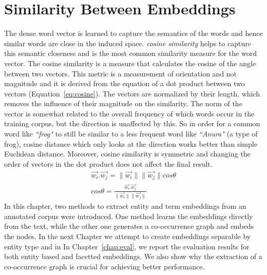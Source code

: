 \section{Similarity Between Embeddings }\label{sec:similarity}
The dense word vector is learned to capture the semantics of the words and hence similar words are close in the induced space. \emph{cosine similarity} helps to capture this semantic closeness and is the most common similarity measure for the word vector. The cosine similarity is a measure that calculates the cosine of the angle between two vectors. This metric is a measurement of orientation and not magnitude and it is derived from the equation of a dot product between two vectors (Equation~\ref{eq:cosine}). The vectors are normalized by their length, which removes the influence of their magnitude on the similarity. The norm of the vector is somewhat related to the overall frequency of which words occur in the training corpus, but the direction is unaffected by this. So in order for a common word like \emph{``frog"} to still be similar to a less frequent word like \emph{``Anura"} (a type of frog), cosine distance which only looks at the direction works better than simple Euclidean distance. Moreover, cosine similarity is symmetric and changing the order of vectors in the dot product does not affect the final result.
\begin{equation}
\begin{split}
\overrightarrow { w_i } .\overrightarrow { w_j } =\parallel \overrightarrow { w_i } \parallel \parallel \overrightarrow { w_j } \parallel cos\theta 
\\
cos\theta =\frac { \overrightarrow { w_i } .\overrightarrow { w_j }  }{ \parallel \overrightarrow { w_i } \parallel \parallel \overrightarrow { w_j } \parallel  } 
\end{split}
\label{eq:cosine}
\end{equation}
\ornament
In this chapter,  two methods to extract entity and term embeddings from an annotated corpus were introduced. One method learns the embeddings directly from the text, while the other one generates a co-occurrence graph and embeds the nodes. In the next Chapter we attempt to create embeddings separable by entity type and in In Chapter~\ref{chap:eval}, we report the evaluation results for both entity based and facetted embeddings. We also show why the extraction of a co-occurrence graph is crucial for achieving better performance. 



